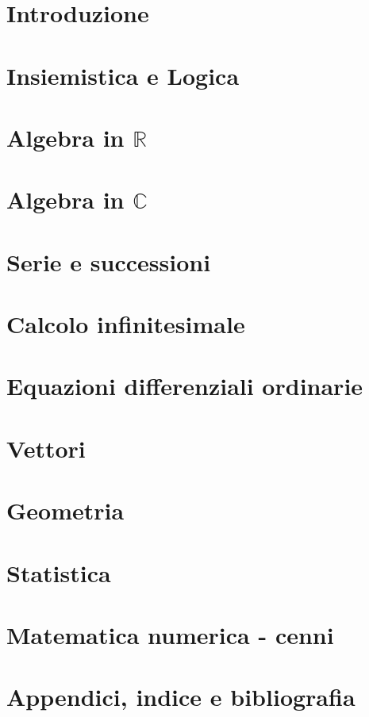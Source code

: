 
\part{Introduzione}\label{book:introduction}


\part{Insiemistica e Logica}\label{book:logics}


\part{Algebra in $\mathbb{R}$}\label{book:algebra}


\part{Algebra in $\mathbb{C}$}\label{book:complex_algebra}


\part{Serie e successioni}\label{book:series}


\part{Calcolo infinitesimale}\label{book:calculus}


\part{Equazioni differenziali ordinarie}\label{book:ode}


\part{Vettori}\label{book:vectors}


\part{Geometria}\label{book:geometry}


\part{Statistica}\label{book:statistics}


\part{Matematica numerica - cenni}\label{book:numerical}


\part{Appendici, indice e bibliografia}
